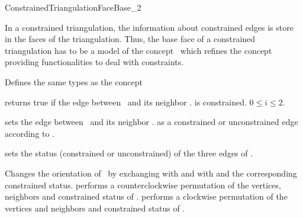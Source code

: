 

\begin{ccRefConcept}{ConstrainedTriangulationFaceBase_2}


\ccDefinition
  
In a constrained triangulation,
the information about constrained edges is store in the 
faces of the triangulation.
Thus, the base face of a constrained triangulation
has to be a model of the concept
\ccRefName\ which  refines the concept
providing functionalities to deal with
constraints.

\ccRefines
{}

\ccTypes
Defines the same types as the  concept


\ccCreation
{}  %


{returns true if the edge between \ccVar\ and its neighbor 
\ccVar . is constrained.
\ccPrecond $0\leq i \leq 2$.}

\begin{ccAdvanced}
\ccModifiers
{}
{sets the edge between \ccVar\ and its neighbor \ccVar .
 as a constrained or unconstrained edge according to .}

{sets the status (constrained or unconstrained) of the three
edges of \ccVar.}

{Changes the orientation of \ccVar\ by exchanging 
with  and  with 
and the corresponding constrained status.}
{performs a counterclockwise permutation of the
 vertices, neighbors and constrained status of  \ccVar.}
{performs a clockwise permutation of the
 vertices and neighbors and constrained status of \ccVar.}




\end{ccAdvanced}
\end{ccRefConcept}
